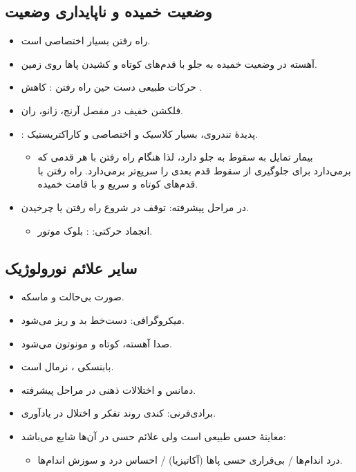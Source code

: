 \documentclass[a4paper,12pt]{extbook}
\begin{document}
\subsection*{وضعیت خمیده و ناپایداری وضعیت}
\begin{itemize}
\item راه رفتن  بسیار اختصاصی است.
\item آهسته در وضعیت خمیده به جلو با قدم‌های کوتاه و کشیدن پاها روی زمین.
\end{itemize}

\begin{itemize}
\item حرکات طبیعی دست حین راه رفتن \MDen{$\downarrow$}: کاهش .
\item فلکشن خفیف در مفصل آرنج، زانو، ران.
\item {}: پدیدهٔ تندروی، بسیار کلاسیک و اختصاصی و کاراکتریستیک.
\begin{itemize}
\item بیمار تمایل به سقوط به جلو دارد، لذا هنگام راه رفتن با هر قدمی که برمی‌دارد برای جلوگیری از سقوط قدم بعدی را سریع‌تر برمی‌دارد. راه رفتن با قدم‌های کوتاه و سریع و با قامت خمیده.
\end{itemize}
\item در مراحل پیشرفته: توقف در شروع راه رفتن یا چرخیدن.
\begin{itemize}
\item انجماد حرکتی: : بلوک موتور.
\end{itemize}
\end{itemize}
\subsection*{سایر علائم نورولوژیک}
\begin{itemize}
\item صورت بی‌حالت و ماسکه.
\item میکروگرافی: دست‌خط بد و ریز می‌شود.
\item صدا آهسته، کوتاه و مونوتون می‌شود.
\item بابنسکی ،  نرمال است.
\item دمانس و اختلالات ذهنی در مراحل پیشرفته.
\item برادی‌فرنی: کندی روند تفکر و اختلال در یادآوری.
\item معاینهٔ حسی طبیعی است ولی علائم حسی در آن‌ها شایع می‌باشد:
\begin{itemize}
\item درد اندام‌ها / بی‌قراری حسی پاها (آکاتیزیا) / احساس درد و سوزش اندام‌ها.
\end{itemize}
\end{itemize}
\end{document}
